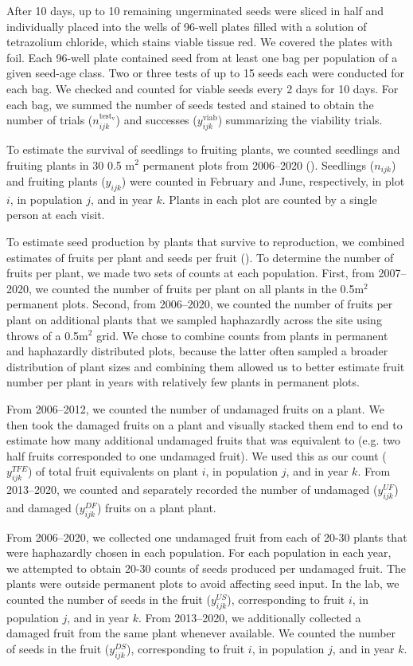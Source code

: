 \documentclass[12pt, oneside, titlepage]{article}   	%
\begin{document}
{After 10 days, up to 10 remaining ungerminated seeds were sliced in half and individually placed into the wells of 96-well plates filled with a solution of tetrazolium chloride, which stains viable tissue red. We covered the plates with foil. Each 96-well plate contained seed from at least one bag per population of a given seed-age class. Two or three tests of up to 15 seeds each were conducted for each bag. We checked and counted for viable seeds  every 2 days for 10 days. For each bag, we summed the number of seeds tested and stained to obtain the number of trials ($n^\mathrm{test_v}_{ijk}$) and successes ($y^{\mathrm{viab}}_{ijk}$) summarizing the viability trials. 

To estimate the survival of seedlings to fruiting plants, we counted seedlings and fruiting plants in 30 0.5 m$^2$ permanent plots from 2006--2020 (\cite{eckhart2011}). Seedlings ($n_{ijk}$) and fruiting plants ($y_{ijk}$) were counted in February and June, respectively, in plot $i$, in population $j$, and in year $k$. Plants in each plot are counted by a single person at each visit. 

To estimate seed production by plants that survive to reproduction, we combined estimates of fruits per plant and seeds per fruit (\cite{eckhart2011}). To determine the number of fruits per plant, we made two sets of counts at each population. First, from 2007--2020, we counted the number of fruits per plant on all plants in the 0.5m$^2$ permanent plots. Second, from 2006--2020, we counted the number of fruits per plant on additional plants that we sampled haphazardly across the site using throws of a 0.5m$^2$ grid. We chose to combine counts from plants in permanent and haphazardly distributed plots, because the latter often sampled a broader distribution of plant sizes and combining them allowed us to better estimate fruit number per plant in years with relatively few plants in permanent plots. 

From 2006--2012, we counted the number of undamaged fruits on a plant. We then took the damaged fruits on a plant and visually stacked them end to end to estimate how many additional undamaged fruits that was equivalent to (e.g. two half fruits corresponded to one undamaged fruit). We used this as our count ($y^{TFE}_{ijk}$) of total fruit equivalents on plant $i$, in population $j$, and in year $k$. From 2013--2020, we counted and separately recorded the number of undamaged ($y^{UF}_{ijk}$) and damaged ($y^{DF}_{ijk}$) fruits on a plant plant. 

From 2006--2020, we collected one undamaged fruit from each of 20-30 plants that were haphazardly chosen in each population. For each population in each year, we attempted to obtain 20-30 counts of seeds produced per undamaged fruit. The plants were outside permanent plots to avoid affecting seed input. In the lab, we counted the number of seeds in the fruit ($y^{US}_{ijk}$), corresponding to fruit $i$, in population $j$, and in year $k$. From 2013--2020, we additionally collected a damaged fruit from the same plant whenever available. We counted the number of seeds in the fruit ($y^{DS}_{ijk}$), corresponding to fruit $i$, in population $j$, and in year $k$.

}
\end{document}
